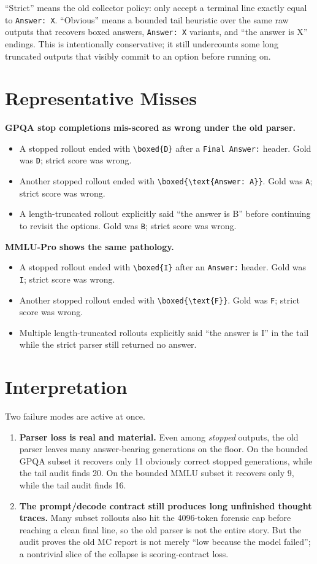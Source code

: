\documentclass[11pt]{article}
\begin{document}
\noindent
``Strict'' means the old collector policy: only accept a terminal line exactly equal
to \texttt{Answer: X}. ``Obvious'' means a bounded tail heuristic over the same raw
outputs that recovers boxed answers, \texttt{Answer: X} variants, and ``the answer is
X'' endings. This is intentionally conservative; it still undercounts some long
truncated outputs that visibly commit to an option before running on.

\section*{Representative Misses}
\textbf{GPQA stop completions mis-scored as wrong under the old parser.}
\begin{itemize}
\item A stopped rollout ended with \texttt{\textbackslash boxed\{D\}} after a
\texttt{Final Answer:} header. Gold was \texttt{D}; strict score was wrong.
\item Another stopped rollout ended with
\texttt{\textbackslash boxed\{\textbackslash text\{Answer: A\}\}}. Gold was
\texttt{A}; strict score was wrong.
\item A length-truncated rollout explicitly said ``the answer is B'' before continuing
to revisit the options. Gold was \texttt{B}; strict score was wrong.
\end{itemize}

\textbf{MMLU-Pro shows the same pathology.}
\begin{itemize}
\item A stopped rollout ended with \texttt{\textbackslash boxed\{I\}} after an
\texttt{Answer:} header. Gold was \texttt{I}; strict score was wrong.
\item Another stopped rollout ended with
\texttt{\textbackslash boxed\{\textbackslash text\{F\}\}}. Gold was \texttt{F};
strict score was wrong.
\item Multiple length-truncated rollouts explicitly said ``the answer is I'' in the
tail while the strict parser still returned no answer.
\end{itemize}

\section*{Interpretation}
Two failure modes are active at once.
\begin{enumerate}
\item \textbf{Parser loss is real and material.} Even among \emph{stopped} outputs,
the old parser leaves many answer-bearing generations on the floor. On the bounded
GPQA subset it recovers only 11 obviously correct stopped generations, while the tail
audit finds 20. On the bounded MMLU subset it recovers only 9, while the tail audit
finds 16.
\item \textbf{The prompt/decode contract still produces long unfinished thought
traces.} Many subset rollouts also hit the 4096-token forensic cap before reaching a
clean final line, so the old parser is not the entire story. But the audit proves the
old MC report is not merely ``low because the model failed''; a nontrivial slice of
the collapse is scoring-contract loss.
\end{enumerate}
\end{document}
